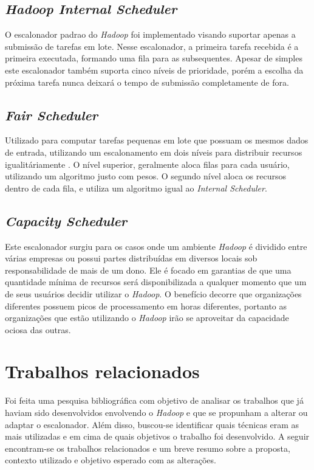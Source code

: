\subsection{\emph{Hadoop Internal Scheduler}}
O escalonador padrao do \emph{Hadoop} foi implementado visando suportar apenas a submissão de tarefas em lote. Nesse escalonador, a primeira tarefa recebida é a primeira executada, formando uma fila para as subsequentes. Apesar de simples este escalonador também suporta cinco níveis de prioridade, porém a escolha da próxima tarefa nunca deixará o tempo de submissão completamente de fora.

\subsection{\emph{Fair Scheduler}}
Utilizado para computar tarefas pequenas em lote que possuam os mesmos dados de entrada, utilizando um escalonamento em dois níveis para distribuir recursos igualitáriamente \cite{FairScheduler}. O nível superior, geralmente aloca filas para cada usuário, utilizando um algoritmo justo com pesos. O segundo nível aloca os recursos dentro de cada fila, e utiliza um algoritmo igual ao \emph{Internal Scheduler}.

\subsection{\emph{Capacity Scheduler}}
Este escalonador surgiu para os casos onde um ambiente \emph{Hadoop} é dividido entre várias empresas ou possui partes distribuídas em diversos locais sob responsabilidade de mais de um dono. Ele é focado em garantias de que uma quantidade mínima de recursos será disponibilizada a qualquer momento que um de seus usuários decidir utilizar o \emph{Hadoop}. O benefício decorre que organizações diferentes possuem picos de processamento em horas diferentes, portanto as organizações que estão utilizando o \emph{Hadoop} irão se aproveitar da capacidade ociosa das outras.

\section{Trabalhos relacionados}

Foi feita uma pesquisa bibliográfica com objetivo de analisar os trabalhos que já haviam sido desenvolvidos envolvendo o \emph{Hadoop} e que se propunham a alterar ou adaptar o escalonador. Além disso, buscou-se identificar quais técnicas eram as mais utilizadas e em cima de quais objetivos o trabalho foi desenvolvido. A seguir encontram-se os trabalhos relacionados e um breve resumo sobre a proposta, contexto utilizado e objetivo esperado com as alterações.


